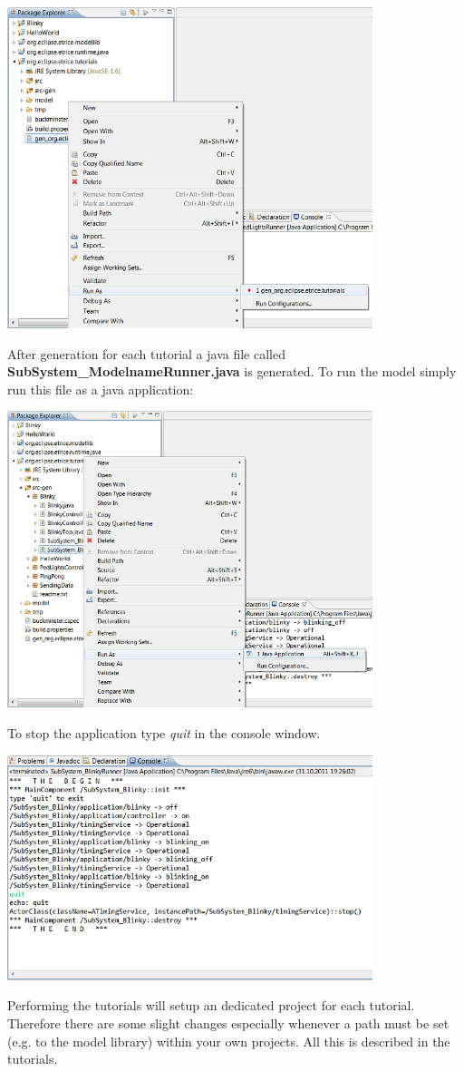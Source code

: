 \includegraphics[width=0.8\textwidth]{images/013-SetupWorkspace05.png}

After generation for each tutorial a java file called \textbf{SubSystem\_ModelnameRunner.java} is generated. To run the model simply run this file as a java application:

\includegraphics[width=0.8\textwidth]{images/013-SetupWorkspace06.png}

To stop the application type \textit{quit} in the console window.
 
\includegraphics[width=0.8\textwidth]{images/013-SetupWorkspace07.png} 

Performing the tutorials will setup an dedicated project for each tutorial. Therefore there are some slight changes especially whenever a path must be set (e.g. to the model library) within your own projects. All this is described in the tutorials.
